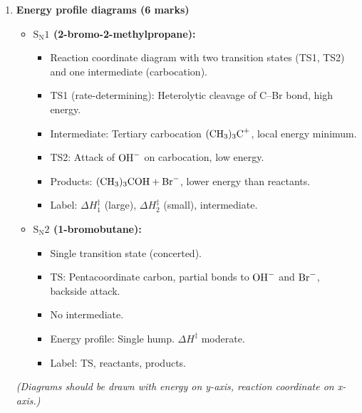 \documentclass[11pt]{article}
\begin{document}
\begin{corrige}
\begin{enumerate}
\item \textbf{Energy profile diagrams (6 marks)}
   \begin{itemize}
   \item \textbf{\(\mathrm{S_N1}\) (2-bromo-2-methylpropane):}
         \begin{itemize}
         \item Reaction coordinate diagram with two transition states (TS1, TS2) and one intermediate (carbocation).
         \item TS1 (rate-determining): Heterolytic cleavage of C–Br bond, high energy.
         \item Intermediate: Tertiary carbocation \(\ce{(CH3)3C+}\), local energy minimum.
         \item TS2: Attack of \(\ce{OH-}\) on carbocation, low energy.
         \item Products: \(\ce{(CH3)3COH} + \ce{Br-}\), lower energy than reactants.
         \item Label: \(\Delta H_1^\ddagger\) (large), \(\Delta H_2^\ddagger\) (small), intermediate.
         \end{itemize}
   \item \textbf{\(\mathrm{S_N2}\) (1-bromobutane):}
         \begin{itemize}
         \item Single transition state (concerted).
         \item TS: Pentacoordinate carbon, partial bonds to \(\ce{OH-}\) and \(\ce{Br-}\), backside attack.
         \item No intermediate.
         \item Energy profile: Single hump. \(\Delta H^\ddagger\) moderate.
         \item Label: TS, reactants, products.
         \end{itemize}
   \end{itemize}
   \textit{(Diagrams should be drawn with energy on y-axis, reaction coordinate on x-axis.)}


\end{enumerate}
\end{corrige}
\end{document}
